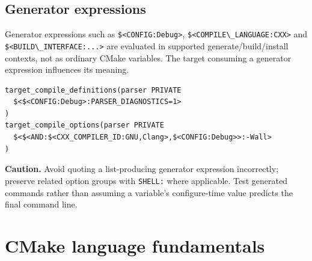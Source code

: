 \documentclass[11pt,letterpaper,oneside]{report}
\providecommand{\passthrough}[1]{#1}
\begin{document}
\section{Generator expressions}\label{generator-expressions}

Generator expressions such as \passthrough{\lstinline!$<CONFIG:Debug>!},
\passthrough{\lstinline!$<COMPILE\_LANGUAGE:CXX>!} and
\passthrough{\lstinline!$<BUILD\_INTERFACE:...>!} are evaluated in
supported generate/build/install contexts, not as ordinary CMake
variables. The target consuming a generator expression influences its
meaning.

\begin{lstlisting}
target_compile_definitions(parser PRIVATE
  $<$<CONFIG:Debug>:PARSER_DIAGNOSTICS=1>
)
target_compile_options(parser PRIVATE
  $<$<AND:$<CXX_COMPILER_ID:GNU,Clang>,$<CONFIG:Debug>>:-Wall>
)
\end{lstlisting}

\textbf{Caution.} Avoid quoting a list-producing generator expression
incorrectly; preserve related option groups with
\passthrough{\lstinline!SHELL:!} where applicable. Test generated
commands rather than assuming a variable's configure-time value predicts
the final command line.

\chapter{CMake language fundamentals}\label{cmake-language-fundamentals}
\end{document}
